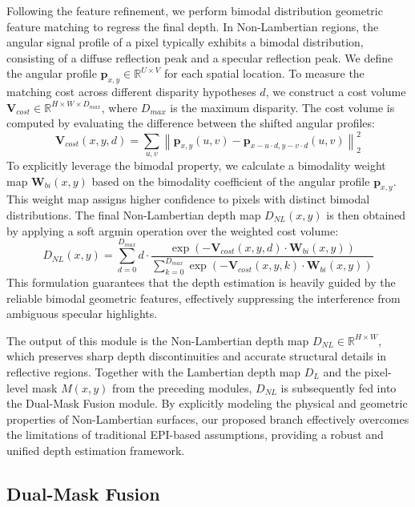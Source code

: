 \documentclass[lettersize,journal]{IEEEtran}
\begin{document}
Following the feature refinement, we perform bimodal distribution geometric feature matching to regress the final depth. In Non-Lambertian regions, the angular signal profile of a pixel typically exhibits a bimodal distribution, consisting of a diffuse reflection peak and a specular reflection peak. We define the angular profile $\mathbf{p}_{x,y} \in \mathbb{R}^{U \times V}$ for each spatial location. To measure the matching cost across different disparity hypotheses $d$, we construct a cost volume $\mathbf{V}_{cost} \in \mathbb{R}^{H \times W \times D_{max}}$, where $D_{max}$ is the maximum disparity. The cost volume is computed by evaluating the difference between the shifted angular profiles:
\begin{equation} \label{eq:ch3_14}
\mathbf{V}_{cost}(x,y,d) = \sum_{u,v} \left\| \mathbf{p}_{x,y}(u,v) - \mathbf{p}_{x-u \cdot d, y-v \cdot d}(u,v) \right\|_2^2
\end{equation}
To explicitly leverage the bimodal property, we calculate a bimodality weight map $\mathbf{W}_{bi}(x,y)$ based on the bimodality coefficient of the angular profile $\mathbf{p}_{x,y}$. This weight map assigns higher confidence to pixels with distinct bimodal distributions. The final Non-Lambertian depth map $D_{NL}(x,y)$ is then obtained by applying a soft argmin operation over the weighted cost volume:
\begin{equation} \label{eq:ch3_15}
D_{NL}(x,y) = \sum_{d=0}^{D_{max}} d \cdot \frac{\exp(-\mathbf{V}_{cost}(x,y,d) \cdot \mathbf{W}_{bi}(x,y))}{\sum_{k=0}^{D_{max}} \exp(-\mathbf{V}_{cost}(x,y,k) \cdot \mathbf{W}_{bi}(x,y))}
\end{equation}
This formulation guarantees that the depth estimation is heavily guided by the reliable bimodal geometric features, effectively suppressing the interference from ambiguous specular highlights.

The output of this module is the Non-Lambertian depth map $D_{NL} \in \mathbb{R}^{H \times W}$, which preserves sharp depth discontinuities and accurate structural details in reflective regions. Together with the Lambertian depth map $D_L$ and the pixel-level mask $M(x,y)$ from the preceding modules, $D_{NL}$ is subsequently fed into the Dual-Mask Fusion module. By explicitly modeling the physical and geometric properties of Non-Lambertian surfaces, our proposed branch effectively overcomes the limitations of traditional EPI-based assumptions, providing a robust and unified depth estimation framework.

\subsection{Dual-Mask Fusion}
\end{document}
